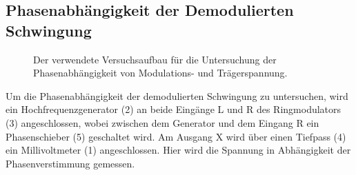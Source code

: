 \subsection{Phasenabhängigkeit der Demodulierten Schwingung}
\begin{figure}[h!]
	\centering
			\caption{Der verwendete Versuchsaufbau für die Untersuchung der Phasenabhängigkeit von Modulations- und Trägerspannung.}
\end{figure}
Um die Phasenabhängigkeit der demodulierten Schwingung zu untersuchen, wird ein Hochfrequenzgenerator (2) an beide Eingänge L und R des Ringmodulators (3) angeschlossen, wobei zwischen dem Generator und dem Eingang R ein Phasenschieber (5) geschaltet wird.
Am Ausgang X  wird über einen Tiefpass (4) ein Millivoltmeter (1) angeschlossen.
Hier wird die Spannung in Abhängigkeit der Phasenverstimmung gemessen.
